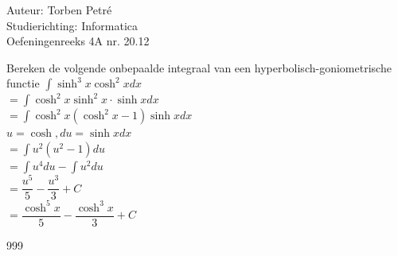 \documentclass[a4paper]{article}
\begin{document}
  
\noindent \large Auteur: Torben Petré \\
\noindent \large Studierichting: Informatica\\
\noindent \large Oefeningenreeks 4A nr. 20.12\\

\medskip

\normalsize

Bereken de volgende onbepaalde integraal van een hyperbolisch-goniometrische functie $\displaystyle\int \sinh^3 x\cosh^2 xdx$\\

$= \displaystyle\int \cosh^2 x\sinh^2 x\cdot\sinh xdx$\\

$= \displaystyle\int \cosh^2 x(\cosh^2 x - 1)\sinh xdx$\\

$u = \cosh, du = \sinh xdx$ \\

$= \displaystyle\int u^2(u^2 - 1)du$\\

$= \displaystyle\int u^4du - \displaystyle\int u^2du$\\

$= \dfrac{u^5}{5} - \dfrac{u^3}{3} + C$\\

$= \dfrac{\cosh^5 x}{5} - \dfrac{\cosh^3 x}{3} + C$\\

\begin{thebibliography}{999}
\end{thebibliography}
\end{document}
